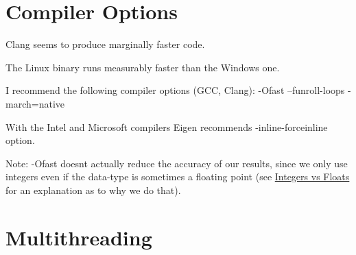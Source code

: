 \hypertarget{perf_compoptions}{}\section{Compiler Options}\label{perf_compoptions}

\begin{DoxyItemize}
\item Clang seems to produce marginally faster code.
\item The Linux binary runs measurably faster than the Windows one.
\item I recommend the following compiler options (G\+CC, Clang)\+: {\ttfamily -\/\+Ofast --funroll-\/loops -\/march=native }
\item With the Intel and Microsoft compilers Eigen recommends {\ttfamily -\/inline-\/forceinline} option.
\item Note\+: {\ttfamily -\/\+Ofast} doesn\textquotesingle{}t actually reduce the accuracy of our results, since we only use integers even if the data-\/type is sometimes a floating point (see \hyperlink{perf_intvsfloat}{Integers vs Floats} for an explanation as to why we do that). 
\end{DoxyItemize}\hypertarget{perf_thread}{}\section{Multithreading}\label{perf_thread}

